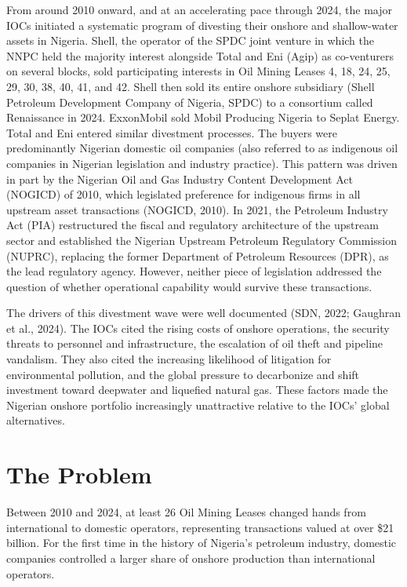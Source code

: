From around 2010 onward, and at an accelerating pace through 2024, the
major IOCs initiated a systematic program of divesting their onshore and
shallow-water assets in Nigeria. Shell, the operator of the SPDC joint
venture in which the NNPC held the majority interest alongside Total and
Eni (Agip) as co-venturers on several blocks, sold participating
interests in Oil Mining Leases 4, 18, 24, 25, 29, 30, 38, 40, 41, and
42. Shell then sold its entire onshore subsidiary (Shell Petroleum
Development Company of Nigeria, SPDC) to a consortium called Renaissance
in 2024. ExxonMobil sold Mobil Producing Nigeria to Seplat Energy. Total
and Eni entered similar divestment processes. The buyers were
predominantly Nigerian domestic oil companies (also referred to as
indigenous oil companies in Nigerian legislation and industry practice).
This pattern was driven in part by the Nigerian Oil and Gas Industry
Content Development Act (NOGICD) of 2010, which legislated preference
for indigenous firms in all upstream asset transactions (NOGICD, 2010).
In 2021, the Petroleum Industry Act (PIA) restructured the fiscal and
regulatory architecture of the upstream sector and established the
Nigerian Upstream Petroleum Regulatory Commission (NUPRC), replacing the
former Department of Petroleum Resources (DPR), as the lead regulatory
agency. However, neither piece of legislation addressed the question of
whether operational capability would survive these transactions.

The drivers of this divestment wave were well documented (SDN, 2022;
Gaughran et al., 2024). The IOCs cited the rising costs of onshore
operations, the security threats to personnel and infrastructure, the
escalation of oil theft and pipeline vandalism. They also cited the
increasing likelihood of litigation for environmental pollution, and the
global pressure to decarbonize and shift investment toward deepwater and
liquefied natural gas. These factors made the Nigerian onshore portfolio
increasingly unattractive relative to the IOCs' global alternatives.

\hypertarget{the-problem}{%
\section{The Problem}\label{the-problem}}

Between 2010 and 2024, at least 26 Oil Mining Leases changed hands from
international to domestic operators, representing transactions valued at
over \$21 billion. For the first time in the history of Nigeria's
petroleum industry, domestic companies controlled a larger share of
onshore production than international operators.

